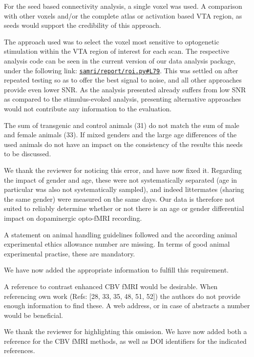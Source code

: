 \begin{point}
	For the seed based connectivity analysis, a single voxel was used. A comparison with other voxels and/or the complete atlas or activation based VTA region, as seeds would support the credibility of this approach.
\end{point}
\begin{reply}
	The approach used was to select the voxel most sensitive to optogenetic stimulation within the VTA region of interest for each scan.
	The respective analysis code can be seen in the current version of our data analysis package, under the following link: \href{https://github.com/IBT-FMI/SAMRI/blob/6e811dd96e1d545e7081dcb2ff2a57485fb7219d/samri/report/roi.py#L79}{\texttt{samri/report/roi.py\#L79}}.
	This was settled on after repeated testing so as to offer the best signal to noise, and all other approaches provide even lower SNR.
	As the analysis presented already suffers from low SNR as compared to the stimulus-evoked analysis, presenting alternative approaches would not contribute any information to the evaluation.
\end{reply}

\begin{point}
	The sum of transgenic and control animals (31) do not match the sum of male and female animals (33). If mixed genders and the large age differences of the used animals do not have an impact on the consistency of the results this needs to be discussed.
\end{point}
\begin{reply}
	We thank the reviewer for noticing this error, and have now fixed it.
	Regarding the impact of gender and age, these were not systematically separated (age in particular was also not systematically sampled), and indeed littermates (sharing the same gender) were measured on the same days.
	Our data is therefore not suited to reliably determine whether or not there is an age or gender differential impact on dopaminergic opto-fMRI recording.
\end{reply}

\begin{point}
	A statement on animal handling guidelines followed and the according animal experimental ethics allowance number are missing. In terms of good animal experimental practise, these are mandatory.
\end{point}
\begin{reply}
	We have now added the appropriate information to fulfill this requirement.
\end{reply}

\begin{point}
	A reference to contrast enhanced CBV fMRI would be desirable. When referencing own work (Refs: [28, 33, 35, 48, 51, 52]) the authors do not provide enough information to find these. A web address, or in case of abstracts a number would be beneficial.
\end{point}
\begin{reply}
	We thank the reviewer for highlighting this omission.
	We have now added both a reference for the CBV fMRI methods, as well as DOI identifiers for the indicated references.
\end{reply}

